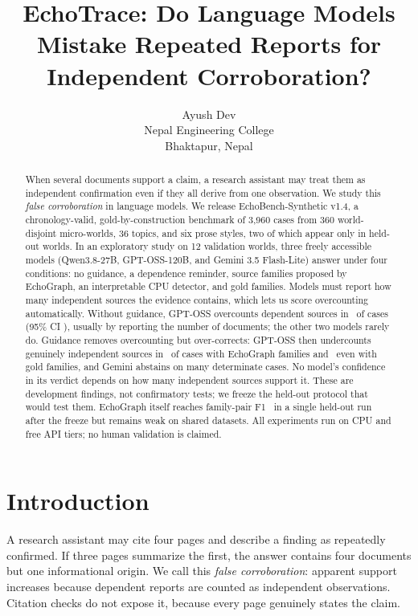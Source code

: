 \documentclass[11pt]{article}
\title{EchoTrace: Do Language Models Mistake Repeated Reports for Independent Corroboration?}
\author{Ayush Dev\\
  Nepal Engineering College\\
  Bhaktapur, Nepal}
\begin{document}
\maketitle

\begin{abstract}
When several documents support a claim, a research assistant may treat them as independent
confirmation even if they all derive from one observation. We study this \emph{false
corroboration} in language models. We release EchoBench-Synthetic v1.4, a chronology-valid,
gold-by-construction benchmark of 3,960 cases from 360 world-disjoint micro-worlds, 36 topics, and
six prose styles, two of which appear only in held-out worlds. In an exploratory study on 12
validation worlds, three freely accessible models (Qwen3.8-27B, GPT-OSS-120B, and Gemini 3.5
Flash-Lite) answer under four conditions: no guidance, a dependence reminder, source families
proposed by EchoGraph, an interpretable CPU detector, and gold families. Models must report how
many independent sources the evidence contains, which lets us score overcounting automatically.
Without guidance, GPT-OSS overcounts dependent sources in \DevGptossStandardFcr\ of cases (95\%
CI \DevGptossStandardFcrCI), usually by reporting the number of documents; the other two models
rarely do. Guidance removes overcounting but over-corrects: GPT-OSS then undercounts genuinely
independent sources in \DevGptossEchographUnder\ of cases with EchoGraph families and
\DevGptossOracleUnder\ even with gold families, and Gemini abstains on many determinate cases. No
model's confidence in its verdict depends on how many independent sources support it. These are
development findings, not confirmatory tests; we freeze the held-out protocol that would test
them. EchoGraph itself reaches family-pair F1 \EchoFOneTest\ in a single held-out run after the
freeze but remains weak on shared datasets. All experiments run on CPU and free API tiers; no human validation is claimed.
\end{abstract}

\section{Introduction}
A research assistant may cite four pages and describe a finding as repeatedly confirmed. If three
pages summarize the first, the answer contains four documents but one informational origin. We call
this \emph{false corroboration}: apparent support increases because dependent reports are counted
as independent observations. Citation checks do not expose it, because every page genuinely states
the claim.
\end{document}
